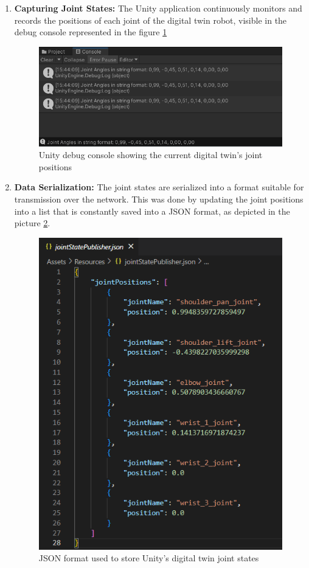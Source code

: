     \begin{enumerate}
        \item \textbf{Capturing Joint States:} The Unity application continuously monitors and records the positions of each joint of the digital twin robot, visible in the debug console represented in the figure \ref{fig:debug_joint_state}
        \begin{figure}[htpb]
            \centering
            \includegraphics[width=0.8\linewidth]{figs/JointState_debug.png}
            \caption{Unity debug console showing the current digital twin's joint positions}
            \label{fig:debug_joint_state}
        \end{figure}
        \item \textbf{Data Serialization:} The joint states are serialized into a format suitable for transmission over the network. This was done by updating the joint positions into a list that is constantly saved into a JSON format, as depicted in the picture \ref{fig:json_pub}.
            \begin{figure}[htbp]
            \centering
            \includegraphics[width=0.5\linewidth]{figs/joint_states_json.png}
            \caption{JSON format used to store Unity's digital twin joint states}
            \label{fig:json_pub}
            \end{figure}

\end{enumerate}
